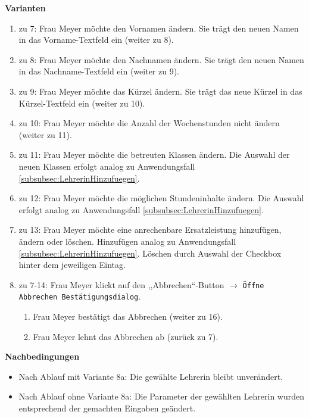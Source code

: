 \documentclass[fontsize=12pt,paper=a4,twoside]{scrartcl}
\begin{document}
\textbf{Varianten}
\begin{enumerate}
\item zu 7: Frau Meyer möchte den Vornamen ändern. Sie trägt den neuen Namen in das Vorname-Textfeld ein (weiter zu 8).
\item zu 8: Frau Meyer möchte den Nachnamen ändern. Sie trägt den neuen Namen in das Nachname-Textfeld ein (weiter zu 9).
\item zu 9: Frau Meyer möchte das Kürzel ändern. Sie trägt das neue Kürzel in das Kürzel-Textfeld ein (weiter zu 10).
\item zu 10: Frau Meyer möchte die Anzahl der Wochenstunden nicht ändern (weiter zu 11).
\item zu 11: Frau Meyer möchte die betreuten Klassen ändern. Die Auswahl der neuen Klassen erfolgt
	analog zu Anwendungsfall \ref{subsubsec:LehrerinHinzufuegen}.
\item zu 12: Frau Meyer möchte die möglichen Stundeninhalte ändern. Die Auswahl erfolgt analog zu Anwendungsfall \ref{subsubsec:LehrerinHinzufuegen}.
\item zu 13: Frau Meyer möchte eine anrechenbare Ersatzleistung hinzufügen, ändern oder löschen. Hinzufügen analog zu Anwendungsfall \ref{subsubsec:LehrerinHinzufuegen}. Löschen durch Auswahl der Checkbox hinter dem jeweiligen Eintag.
\item zu 7-14: Frau Meyer klickt auf den ,,Abbrechen``-Button $\rightarrow$ \texttt{Öffne Abbrechen Bestätigungsdialog}.
	\begin{enumerate}[label={\alph*.}]
	\item Frau Meyer bestätigt das Abbrechen (weiter zu 16).
	\item Frau Meyer lehnt das Abbrechen ab (zurück zu 7).
	\end{enumerate}
\end{enumerate}
\vspace{5pt}

\textbf{Nachbedingungen}
\begin{itemize}
\item Nach Ablauf mit Variante 8a: Die gewählte Lehrerin bleibt unverändert.
\item Nach Ablauf ohne Variante 8a: Die Parameter der gewählten Lehrerin wurden entsprechend der gemachten Eingaben geändert.
\end{itemize}
\vspace{5pt}
\end{document}

